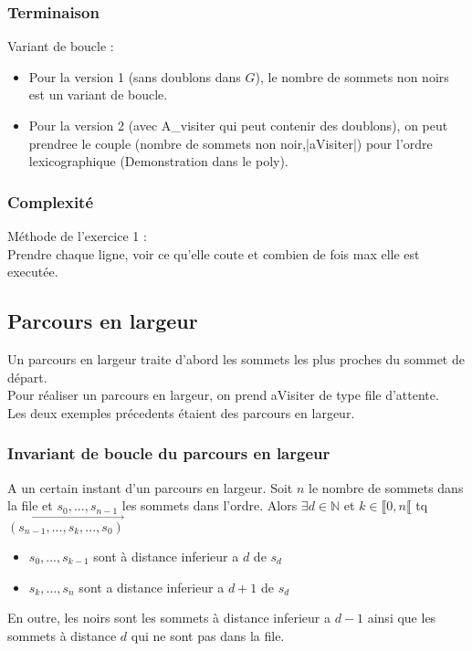 \subsubsection{Terminaison}

Variant de boucle :\\
\begin{itemize}
    \item Pour la version 1 (sans doublons dans $G$), le nombre de sommets non noirs est un variant de boucle.
    \item Pour la version 2 (avec A_visiter qui peut contenir des doublons), on peut prendree le couple (nombre de sommets non noir,|aVisiter|) pour l'ordre lexicographique (Demonstration dans le poly). 
\end{itemize}

\subsubsection{Complexité}
Méthode de l'exercice 1 :  \\
Prendre chaque ligne, voir ce qu'elle coute et combien de fois max elle est executée.\\

\subsection{Parcours en largeur}

Un parcours en largeur traite d'abord les sommets les plus proches du sommet de départ.\\

Pour réaliser un parcours en largeur, on prend aVisiter de type file d'attente.  \\
Les deux exemples précedents étaient des parcours en largeur. \\
\subsubsection{Invariant de boucle du parcours en largeur}

\begin{prop}
A un certain instant d'un parcours en largeur. Soit $n$ le nombre de sommets dans la file et $s_0,...,s_{n-1}$ les sommets dans l'ordre.  
Alors $\exists d \in \mathbb N$ et $k \in \llbracket 0,n\llbracket $ tq $\vec{(s_{n-1},...,s_k,...,s_0)}$
\begin{itemize}
    \item $s_0,...,s_{k-1}$ sont à distance inferieur a $d$ de $s_d$
    \item $s_k,...,s_{n}$ sont a distance inferieur a $d+1$ de $s_d$
\end{itemize}
En outre, les noirs sont les sommets à distance inferieur a $d-1$ ainsi que les sommets à distance $d$ qui ne sont pas dans la file.
\end{prop}

